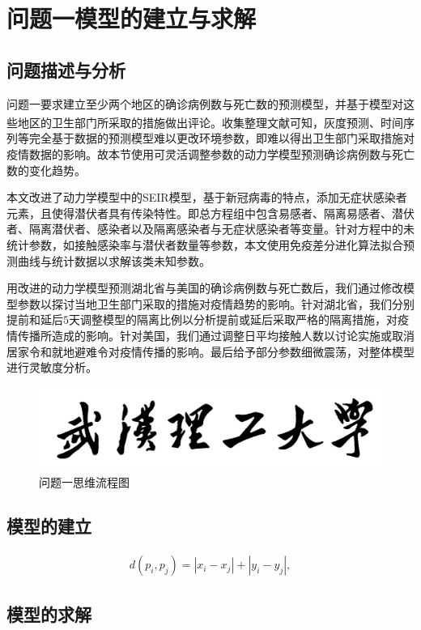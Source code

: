 \documentclass{whutmod}
\newcommand{\upcite}[1]{\textsuperscript{\cite{#1}}}
\begin{document}
	\section{问题一模型的建立与求解}
		\subsection{问题描述与分析}
			问题一要求建立至少两个地区的确诊病例数与死亡数的预测模型，并基于模型对这些地区的卫生部门所采取的措施做出评论。收集整理文献可知\upcite{2,3}，灰度预测、时间序列等完全基于数据的预测模型难以更改环境参数，即难以得出卫生部门采取措施对疫情数据的影响。故本节使用可灵活调整参数的动力学模型预测确诊病例数与死亡数的变化趋势。
			
			本文改进了动力学模型中的SEIR模型，基于新冠病毒的特点，添加无症状感染者元素，且使得潜伏者具有传染特性。即总方程组中包含易感者、隔离易感者、潜伏者、隔离潜伏者、感染者以及隔离感染者与无症状感染者等变量。针对方程中的未统计参数，如接触感染率与潜伏者数量等参数，本文使用免疫差分进化算法拟合预测曲线与统计数据以求解该类未知参数。
			
			用改进的动力学模型预测湖北省与美国的确诊病例数与死亡数后，我们通过修改模型参数以探讨当地卫生部门采取的措施对疫情趋势的影响。针对湖北省，我们分别提前和延后$5$天调整模型的隔离比例以分析提前或延后采取严格的隔离措施，对疫情传播所造成的影响。针对美国，我们通过调整日平均接触人数以讨论实施或取消居家令和就地避难令对疫情传播的影响。最后给予部分参数细微震荡，对整体模型进行灵敏度分析。
			
			\begin{figure}[H]
				\centering
				\includegraphics[width=\textwidth]{figures/whut.jpg}
				\caption{问题一思维流程图}\label{lct}
			\end{figure}
			
		\subsection{模型的建立}
			\begin{gather*}
			d(p_i,p_j)=\left | x_i-x_j \right |+\left | y_i-y_j \right | ,
			\end{gather*}
		
		
		\subsection{模型的求解}
\end{document}
